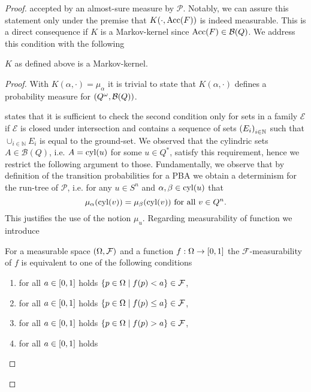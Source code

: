 \begin{proof}
  accepted by an almost-sure measure by $\mathcal{P}$. Notably, we can assure 
  this statement only under the premise that $K(\cdot, \operatorname{Acc}(F))$ is indeed 
  measurable. This is a direct consequence if $K$ is a Markov-kernel since 
  $\operatorname{Acc}(F)\in\mathcal{B}(Q)$. We address this condition with the following
  \begin{lemma}
    $K$ as defined above is a Markov-kernel.
  \end{lemma}
  \begin{proof}
    With $K(\alpha,\cdot) = \mu_{\alpha}$ it is trivial to state that 
    $K(\alpha,\cdot)$ defines a probability measure for 
    $\left(Q^{\omega},\mathcal{B}(Q)\right)$.

    \cite[Remark 8.26]{Klenke} states that it is sufficient to check the second 
    condition only for sets in a family $\mathcal{E}$ if $\mathcal{E}$ is 
    closed under intersection and contains a sequence of sets 
    $\left(E_{i}\right)_{i\in\mathbb{N}}$ such that $\cup_{i\in\mathbb{N}}E_{i}$ is
    equal to the ground-set. We observed that the cylindric sets 
    $A\in\mathcal{B}(Q)$, i.e. $A = \operatorname{cyl}(u)$ for some $u\in Q^{*}$, satisfy 
    this requirement, hence we restrict the following argument to those.
    Fundamentally, we observe that by definition of the transition 
    probabilities for a \ac{PBA} we obtain a determinism for the run-tree of 
    $\mathcal{P}$, i.e. for any $u\in S^{n}$ and $\alpha, \beta\in\operatorname{cyl}(u)$ that
    \begin{equation*}
      \mu_{\alpha}(\operatorname{cyl}(v)) = \mu_{\beta}(\operatorname{cyl}(v))\text{ for all }v\in Q^{n}.
    \end{equation*}
    This justifies the use of the notion $\mu_{u}$.
    Regarding measurability of function we introduce
    \begin{theorem}
      \cite[Theorem 9.2]{Bauer}
      For a measurable space $\left(\Omega, \mathcal{F}\right)$ and a function 
      $f:\Omega\rightarrow\left[0,1\right]$ the $\mathcal{F}$-measurability of
      $f$ is equivalent to one of the following conditions
      \begin{enumerate}
        \item for all $a\in\left[0,1\right]$ holds 
          $\left\{p\in\Omega\mid f(p) < a\right\}\in\mathcal{F}$,
        \item for all $a\in\left[0,1\right]$ holds 
          $\left\{p\in\Omega\mid f(p) \leq a\right\}\in\mathcal{F}$,
        \item for all $a\in\left[0,1\right]$ holds 
          $\left\{p\in\Omega\mid f(p) > a\right\}\in\mathcal{F}$,
        \item for all $a\in\left[0,1\right]$ holds 

\end{enumerate}
\end{theorem}
\end{proof}
\end{proof}
